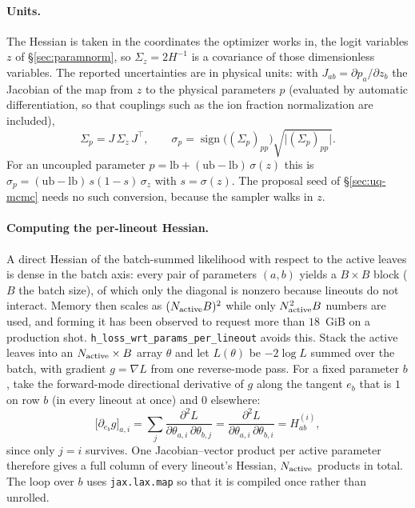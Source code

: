 \documentclass[11pt]{article}
\newcommand{\code}[1]{\texttt{#1}}
\begin{document}
\paragraph{Units.} The Hessian is taken in the coordinates the optimizer works in, the
logit variables $z$ of \S\ref{sec:paramnorm}, so $\Sigma_z=2H^{-1}$ is a covariance of
those dimensionless variables. The reported uncertainties are in physical units: with
$J_{ab}=\partial p_a/\partial z_b$ the Jacobian of the map from $z$ to the physical
parameters $p$ (evaluated by automatic differentiation, so that couplings such as the ion
fraction normalization are included),
\begin{equation}
  \Sigma_p = J\,\Sigma_z\,J^{\!\top},\qquad
  \sigma_p = \operatorname{sign}\big((\Sigma_p)_{pp}\big)\sqrt{\vert(\Sigma_p)_{pp}\vert}.
\end{equation}
For an uncoupled parameter $p=\mathrm{lb}+(\mathrm{ub}-\mathrm{lb})\,\sigma(z)$ this is
$\sigma_p=(\mathrm{ub}-\mathrm{lb})\,s(1-s)\,\sigma_z$ with $s=\sigma(z)$. The proposal
seed of \S\ref{sec:uq-mcmc} needs no such conversion, because the sampler walks in $z$.

\paragraph{Computing the per-lineout Hessian.} A direct Hessian of the batch-summed
likelihood with respect to the active leaves is dense in the batch axis: every pair of
parameters $(a,b)$ yields a $B\times B$ block ($B$ the batch size), of which only the
diagonal is nonzero because lineouts do not interact. Memory then scales as
$(N_{\rm active}B)^2$ while only $N_{\rm active}^2B$ numbers are used, and forming it has
been observed to request more than $18$~GiB on a production shot.
\code{h\_loss\_wrt\_params\_per\_lineout} avoids this. Stack the active leaves into an
$N_{\rm active}\times B$ array $\theta$ and let $L(\theta)$ be $-2\log L$ summed over the
batch, with gradient $g=\nabla L$ from one reverse-mode pass. For a fixed parameter $b$,
take the forward-mode directional derivative of $g$ along the tangent $e_b$ that is $1$ on
row $b$ (in every lineout at once) and $0$ elsewhere:
\begin{equation}
  \big[\partial_{e_b}g\big]_{a,i}
  = \sum_{j}\frac{\partial^2L}{\partial\theta_{a,i}\,\partial\theta_{b,j}}
  = \frac{\partial^2L}{\partial\theta_{a,i}\,\partial\theta_{b,i}} = H^{(i)}_{ab},
\end{equation}
since only $j=i$ survives. One Jacobian--vector product per active parameter therefore
gives a full column of every lineout's Hessian, $N_{\rm active}$ products in total. The
loop over $b$ uses \code{jax.lax.map} so that it is compiled once rather than unrolled.
\end{document}
